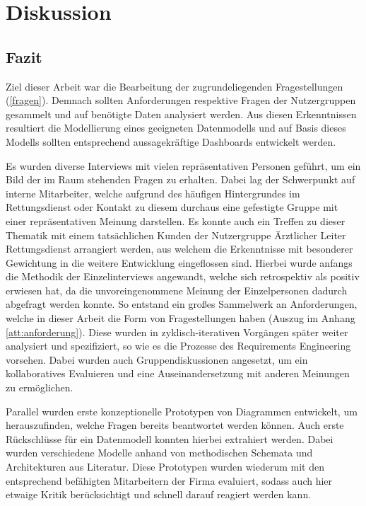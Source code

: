 \chapter{Diskussion}
\label{fazit}
\minitoc
\clearpage

\section{Fazit}
Ziel dieser Arbeit war die Bearbeitung der zugrundeliegenden Fragestellungen (\ref{fragen}).
Demnach sollten Anforderungen respektive Fragen der Nutzergruppen gesammelt und auf benötigte Daten analysiert werden.
Aus diesen Erkenntnissen resultiert die Modellierung eines geeigneten Datenmodells und auf Basis dieses Modells sollten entsprechend aussagekräftige Dashboards entwickelt werden.

Es wurden diverse Interviews mit vielen repräsentativen Personen geführt, um ein Bild der im Raum stehenden Fragen zu erhalten.
Dabei lag der Schwerpunkt auf interne Mitarbeiter, welche aufgrund des häufigen Hintergrundes im Rettungsdienst oder Kontakt zu diesem durchaus eine gefestigte Gruppe mit einer repräsentativen Meinung darstellen.
Es konnte auch ein Treffen zu dieser Thematik mit einem tatsächlichen Kunden der Nutzergruppe \glqq Ärztlicher Leiter Rettungsdienst\grqq{} arrangiert werden, aus welchem die Erkenntnisse mit besonderer Gewichtung in die weitere Entwicklung eingeflossen sind.
Hierbei wurde anfangs die Methodik der Einzelinterviews angewandt, welche sich retrospektiv als positiv erwiesen hat, da die unvoreingenommene Meinung der Einzelpersonen dadurch abgefragt werden konnte.
So entstand ein großes Sammelwerk an Anforderungen, welche in dieser Arbeit die Form von Fragestellungen haben (Auszug im Anhang \ref{att:anforderung}).
Diese wurden in zyklisch-iterativen Vorgängen später weiter analysiert und spezifiziert, so wie es die Prozesse des Requirements Engineering vorsehen. 
Dabei wurden auch Gruppendiskussionen angesetzt, um ein kollaboratives Evaluieren und eine Auseinandersetzung mit anderen Meinungen zu ermöglichen.

Parallel wurden erste konzeptionelle Prototypen von Diagrammen entwickelt, um herauszufinden, welche Fragen bereits beantwortet werden können.
Auch erste Rückschlüsse für ein Datenmodell konnten hierbei extrahiert werden.
Dabei wurden verschiedene Modelle anhand von methodischen Schemata und Architekturen aus Literatur.
Diese Prototypen wurden wiederum mit den entsprechend befähigten Mitarbeitern der Firma evaluiert, sodass auch hier etwaige Kritik berücksichtigt und schnell darauf reagiert werden kann.

